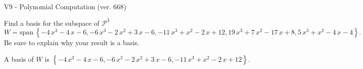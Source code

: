 \begin{exercise}
  \begin{exerciseTitle}V9 - Polynomial Computation (ver. 668)\end{exerciseTitle}
  \begin{exerciseStatement}
    Find a basis for the subspace of \(\mathcal{P}^3\) 
\[W=\mathrm{span}\ \left\{-4 \, x^{3} - 4 \, x - 6 , -6 \, x^{3} - 2 \, x^{2} + 3 \, x - 6 , -11 \, x^{3} + x^{2} - 2 \, x + 12 , 19 \, x^{3} + 7 \, x^{2} - 17 \, x + 8 , 5 \, x^{3} + x^{2} - 4 \, x - 4\right\}.\]
 Be sure to explain why your result is a basis.


  \end{exerciseStatement}
  \begin{exerciseAnswer}
   A basis of \(W\) is  \(\left\{-4 \, x^{3} - 4 \, x - 6 , -6 \, x^{3} - 2 \, x^{2} + 3 \, x - 6 , -11 \, x^{3} + x^{2} - 2 \, x + 12\right\}\).
  


  \end{exerciseAnswer}
\end{exercise}